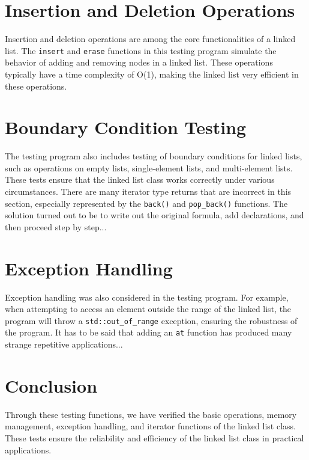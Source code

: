 \documentclass[12pt]{article}
\begin{document}
\section{Insertion and Deletion Operations}
Insertion and deletion operations are among the core functionalities of a linked list. The \texttt{insert} and \texttt{erase} functions in this testing program simulate the behavior of adding and removing nodes in a linked list. These operations typically have a time complexity of O(1), making the linked list very efficient in these operations.

\section{Boundary Condition Testing}
The testing program also includes testing of boundary conditions for linked lists, such as operations on empty lists, single-element lists, and multi-element lists. These tests ensure that the linked list class works correctly under various circumstances. There are many iterator type returns that are incorrect in this section, especially represented by the \texttt{back()} and \texttt{pop\_back()} functions. The solution turned out to be to write out the original formula, add declarations, and then proceed step by step...

\section{Exception Handling}
Exception handling was also considered in the testing program. For example, when attempting to access an element outside the range of the linked list, the program will throw a \texttt{std::out\_of\_range} exception, ensuring the robustness of the program. It has to be said that adding an \texttt{at} function has produced many strange repetitive applications...

\section{Conclusion}
Through these testing functions, we have verified the basic operations, memory management, exception handling, and iterator functions of the linked list class. These tests ensure the reliability and efficiency of the linked list class in practical applications.
\end{document}
